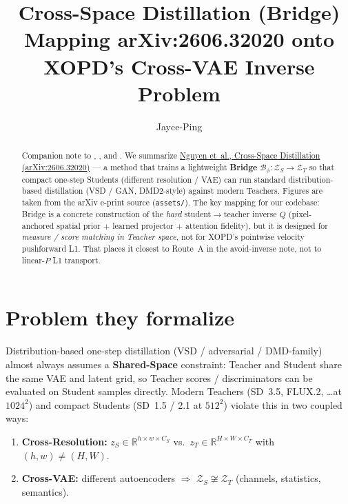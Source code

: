 \documentclass[11pt,a4paper]{article}
\title{\textbf{Cross-Space Distillation (Bridge)}\\[0.3em]
\large Mapping arXiv:2606.32020 onto XOPD's Cross-VAE Inverse Problem}
\author{Jayce-Ping}
\date{}
\newcommand{\R}{\mathbb{R}}
\newcommand{\Za}{\mathcal{Z}_{T}}
\newcommand{\Zb}{\mathcal{Z}_{S}}
\newcommand{\Bridge}{\mathcal{B}}
\theoremstyle{definition}
\begin{document}
\maketitle

\begin{abstract}
Companion note to ,
, and
.
We summarize
\href{https://arxiv.org/abs/2606.32020}{Nguyen et~al., Cross-Space Distillation
(arXiv:2606.32020)} --- a method that trains a lightweight
\textbf{Bridge} $\Bridge_\phi:\Zb\to\Za$ so that compact one-step Students
(different resolution / VAE) can run standard distribution-based distillation
(VSD / GAN, DMD2-style) against modern Teachers.
Figures are taken from the arXiv e-print source (\texttt{assets/}).
The key mapping for our codebase: Bridge is a concrete construction of the
\emph{hard} student$\to$teacher inverse $Q$ (pixel-anchored spatial prior $+$
learned projector $+$ attention fidelity), but it is designed for
\emph{measure / score matching in Teacher space}, not for XOPD's pointwise
velocity pushforward L1. That places it closest to Route~A in the avoid-inverse
note, not to linear-$P$ L1 transport.
\end{abstract}

\section{Problem they formalize}
\label{sec:problem}

Distribution-based one-step distillation (VSD / adversarial / DMD-family) almost always
assumes a \textbf{Shared-Space} constraint: Teacher and Student share the same VAE and
latent grid, so Teacher scores / discriminators can be evaluated on Student samples
directly. Modern Teachers (SD~3.5, FLUX.2, \ldots at $1024^2$) and compact Students
(SD~1.5 / 2.1 at $512^2$) violate this in two coupled ways:

\begin{enumerate}[leftmargin=1.6em,itemsep=2pt]
  \item \textbf{Cross-Resolution:} $z_S\in\R^{h\times w\times C_S}$ vs.\
        $z_T\in\R^{H\times W\times C_T}$ with $(h,w)\neq(H,W)$.
  \item \textbf{Cross-VAE:} different autoencoders $\Rightarrow$
        $\Zb\not\cong\Za$ (channels, statistics, semantics).
\end{enumerate}
\end{document}

